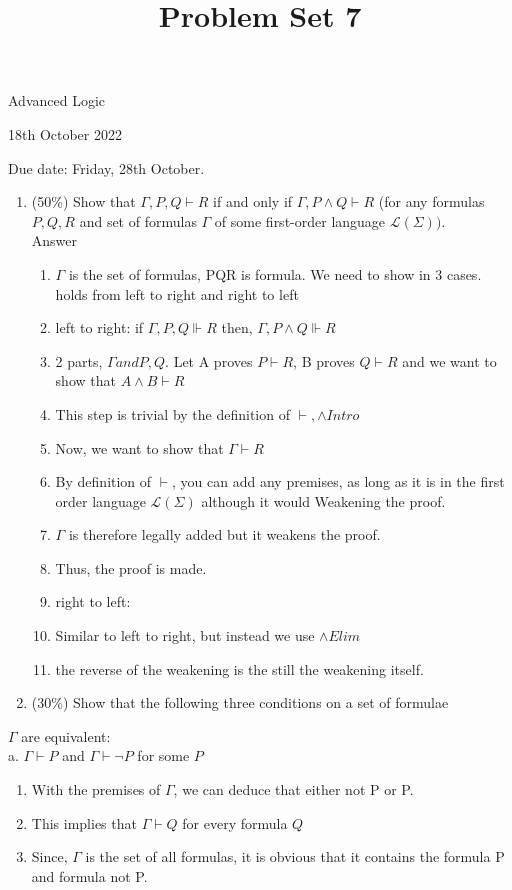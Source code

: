 \documentclass[10pt]{article}
\title{Problem Set 7 }
\author{}
\date{}
\begin{document}
\maketitle
Advanced Logic

18th October 2022

Due date: Friday, 28th October.

\begin{enumerate}
  \item (50\%) Show that $\Gamma, P, Q \vdash R$ if and only if $\Gamma, P \wedge Q \vdash R$ (for any formulas $P, Q, R$ and set of formulas $\Gamma$ of some first-order language $\mathcal{L}(\Sigma))$. 
  \\ Answer 
  \begin{enumerate}
      \item $\Gamma $ is the set of formulas, PQR is formula. We need to show in 3 cases. holds from left to right and right to left
      \item left to right: if
       $\Gamma, P, Q \Vdash R $ then, $\Gamma, P \wedge Q \Vdash R $
      \item 2 parts, $\Gamma and P, Q$. Let A proves $P \vdash R$, B proves $Q \vdash R$ and we want to show that $A \wedge B \vdash R$
      \item This step is trivial by the definition of $\vdash, \wedge Intro$
      \item Now, we want to show that $\Gamma \vdash R$
      \item By definition of $\vdash$, you can add any premises, as long as it is in the first order language $\mathcal{L}(\Sigma)$ although it would Weakening the proof. 
      \item $\Gamma$ is therefore legally added but it weakens the proof. 
      \item Thus, the proof is made.
      \item right to left:
      \item Similar to left to right, but instead we use $\wedge Elim$
      \item the reverse of the weakening is the still the weakening itself. 
  \end{enumerate}
  \item (30\%) Show that the following three conditions on a set of formulae
\end{enumerate} 
  $\Gamma$ are equivalent:\\
a. $\Gamma \vdash P$ and $\Gamma \vdash \neg P$ for some $P$\\
\begin{enumerate}
  \item With the premises of $\Gamma $, we can deduce that either not P or P. 
  \item This implies that $\Gamma \vdash Q$ for every formula $Q$\\
  \item Since, $\Gamma$ is the set of all formulas, it is obvious that it contains the formula P and formula not P. 
\end{enumerate} 
\end{document}
